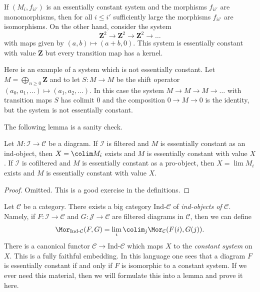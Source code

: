 \noindent
If $(M_i, f_{ii'})$ is an essentially constant system and the morphisms
$f_{ii'}$ are monomorphisms, then for all $i \leq i'$ sufficiently large the
morphisms $f_{ii'}$ are isomorphisms. On the other hand, consider the system
$$
\mathbf{Z}^2 \to \mathbf{Z}^2 \to \mathbf{Z}^2 \to \ldots
$$
with maps given by $(a, b) \mapsto (a + b, 0)$. This system is essentially
constant with value $\mathbf{Z}$ but every transition map has a kernel.

\medskip\noindent
Here is an example of a system which is not essentially constant. Let
$M = \bigoplus_{n \geq 0} \mathbf{Z}$ and to let $S : M \to M$ be the
shift operator $(a_0, a_1, \ldots) \mapsto (a_1, a_2, \ldots)$. In this
case the system $M \to M \to M \to \ldots$ with transition maps $S$
has colimit $0$ and the composition $0 \to M \to 0$ is the identity,
but the system is not essentially constant.

\medskip\noindent
The following lemma is a sanity check.

\begin{lemma}
\label{lemma-essentially-constant-is-limit-colimit}
Let $M : \mathcal{I} \to \mathcal{C}$ be a diagram.
If $\mathcal{I}$ is filtered and $M$ is essentially
constant as an ind-object, then $X = \colim M_i$ exists and $M$
is essentially constant with value $X$.
If $\mathcal{I}$ is cofiltered and $M$ is essentially
constant as a pro-object, then $X = \lim M_i$ exists and $M$ is
essentially constant with value $X$.
\end{lemma}

\begin{proof}
Omitted. This is a good exercise in the definitions.
\end{proof}

\begin{remark}
\label{remark-ind-category}
Let $\mathcal{C}$ be a category. There exists a big category
$\text{Ind-}\mathcal{C}$ of {\it ind-objects of} $\mathcal{C}$.
Namely, if $F : \mathcal{I} \to \mathcal{C}$ and
$G : \mathcal{J} \to \mathcal{C}$ are filtered diagrams in $\mathcal{C}$,
then we can define
$$
\Mor_{\text{Ind-}\mathcal{C}}(F, G) =
\lim_i \colim_j \Mor_\mathcal{C}(F(i), G(j)).
$$
There is a canonical functor $\mathcal{C} \to \text{Ind-}\mathcal{C}$
which maps $X$ to the {\it constant system} on $X$. This is a fully
faithful embedding. In this language one sees that a diagram $F$ is
essentially constant if and only if $F$ is isomorphic to a constant system.
If we ever need this material, then we will formulate this into a lemma
and prove it here.
\end{remark}

